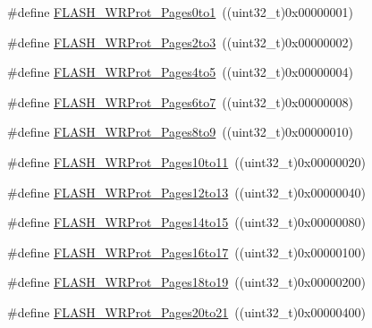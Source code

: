 \begin{DoxyCompactItemize}
\item 
\#define \mbox{\hyperlink{group___option___bytes___write___protection_ga7dfbb58b90b63afef11bfcf7a8f109e2}{F\+L\+A\+S\+H\+\_\+\+W\+R\+Prot\+\_\+\+Pages0to1}}~((uint32\+\_\+t)0x00000001)
\item 
\#define \mbox{\hyperlink{group___option___bytes___write___protection_gaeeb592e66053dde68ebb3ff3926d033d}{F\+L\+A\+S\+H\+\_\+\+W\+R\+Prot\+\_\+\+Pages2to3}}~((uint32\+\_\+t)0x00000002)
\item 
\#define \mbox{\hyperlink{group___option___bytes___write___protection_ga2835294ea5c096360cc5683b7f90b543}{F\+L\+A\+S\+H\+\_\+\+W\+R\+Prot\+\_\+\+Pages4to5}}~((uint32\+\_\+t)0x00000004)
\item 
\#define \mbox{\hyperlink{group___option___bytes___write___protection_ga289b919ff7f6e7287facf108b8b94619}{F\+L\+A\+S\+H\+\_\+\+W\+R\+Prot\+\_\+\+Pages6to7}}~((uint32\+\_\+t)0x00000008)
\item 
\#define \mbox{\hyperlink{group___option___bytes___write___protection_ga72f231c0fe953f3cd43cf421c2626f90}{F\+L\+A\+S\+H\+\_\+\+W\+R\+Prot\+\_\+\+Pages8to9}}~((uint32\+\_\+t)0x00000010)
\item 
\#define \mbox{\hyperlink{group___option___bytes___write___protection_ga778d8038df46c0d25d9a24717a5c5dc9}{F\+L\+A\+S\+H\+\_\+\+W\+R\+Prot\+\_\+\+Pages10to11}}~((uint32\+\_\+t)0x00000020)
\item 
\#define \mbox{\hyperlink{group___option___bytes___write___protection_ga571e248a64ef9bf7f99ed85831aacaaa}{F\+L\+A\+S\+H\+\_\+\+W\+R\+Prot\+\_\+\+Pages12to13}}~((uint32\+\_\+t)0x00000040)
\item 
\#define \mbox{\hyperlink{group___option___bytes___write___protection_ga5e5fcead35c861e1329c3e4e7e3ffa4e}{F\+L\+A\+S\+H\+\_\+\+W\+R\+Prot\+\_\+\+Pages14to15}}~((uint32\+\_\+t)0x00000080)
\item 
\#define \mbox{\hyperlink{group___option___bytes___write___protection_ga33deabc2c4a82cfa4a98008082e29ea7}{F\+L\+A\+S\+H\+\_\+\+W\+R\+Prot\+\_\+\+Pages16to17}}~((uint32\+\_\+t)0x00000100)
\item 
\#define \mbox{\hyperlink{group___option___bytes___write___protection_ga856fdcf3d41edc73902fcf93a1e375d9}{F\+L\+A\+S\+H\+\_\+\+W\+R\+Prot\+\_\+\+Pages18to19}}~((uint32\+\_\+t)0x00000200)
\item 
\#define \mbox{\hyperlink{group___option___bytes___write___protection_ga09215d5d245c8f5cd664c5cc4ff9fb69}{F\+L\+A\+S\+H\+\_\+\+W\+R\+Prot\+\_\+\+Pages20to21}}~((uint32\+\_\+t)0x00000400)
\item 

\end{DoxyCompactItemize}
